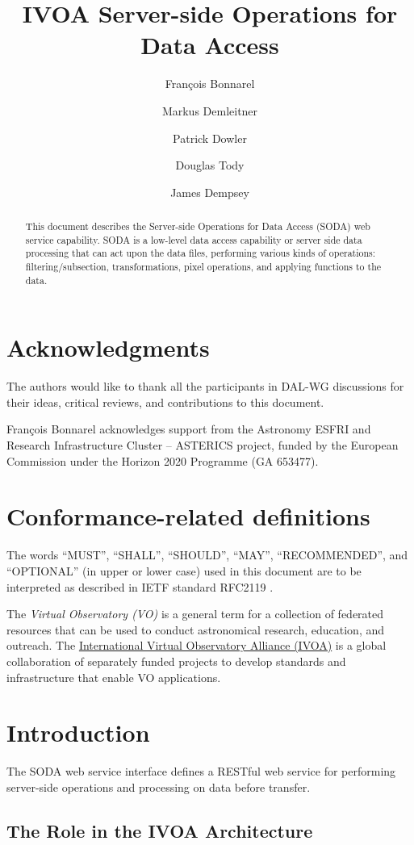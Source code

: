 \documentclass[11pt,a4paper]{ivoa}
\title{IVOA Server-side Operations for Data Access}
\author{Fran\c cois Bonnarel}
\author{Markus Demleitner}
\author{Patrick Dowler}
\author{Douglas Tody}
\author{James Dempsey}
\begin{document}
\begin{abstract}
This document describes the Server-side Operations for Data Access
(SODA) web service capability.  SODA is a low-level data access
capability or server side data processing that can act upon the data
files, performing various kinds of operations: filtering/subsection,
transformations, pixel operations, and applying functions to the data.  
\end{abstract}

\section*{Acknowledgments}
The authors would like to thank all the participants in DAL-WG discussions for
their ideas, critical
reviews, and contributions to this document.

Fran\c cois Bonnarel  acknowledges support  from  the  Astronomy  ESFRI  and Research Infrastructure Cluster – ASTERICS project,  funded by the European Commission under the Horizon 2020 Programme (GA 653477).


\section*{Conformance-related definitions}

The words ``MUST'', ``SHALL'', ``SHOULD'', ``MAY'', ``RECOMMENDED'', and
``OPTIONAL'' (in upper or lower case) used in this document are to be
interpreted as described in IETF standard RFC2119 \citep{std:RFC2119}.

The \emph{Virtual Observatory (VO)} is a
general term for a collection of federated resources that can be used
to conduct astronomical research, education, and outreach.
The \href{http://www.ivoa.net}{International
Virtual Observatory Alliance (IVOA)} is a global
collaboration of separately funded projects to develop standards and
infrastructure that enable VO applications.


\section{Introduction}
The SODA web service interface defines a RESTful web service for
performing server-side operations and processing on data before
transfer.

\subsection{The Role in the IVOA Architecture}
\end{document}
